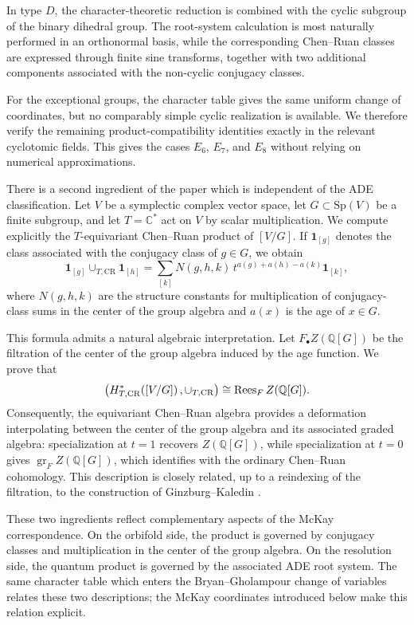 \documentclass[a4paper,reqno]{amsart}
\theoremstyle{plain} %
\theoremstyle{definition} %
\theoremstyle{remark} %
\newcommand{\fo}{\mathbf{1}}
\newcommand{\1}{\mathds{1}}   %
\begin{document}
In type \(D\), the character-theoretic reduction is combined with the cyclic subgroup of the binary dihedral group. 
The root-system calculation is most naturally performed in an orthonormal basis, 
while the corresponding Chen–Ruan classes are expressed through finite sine transforms, 
together with two additional components associated with the non-cyclic conjugacy classes.


For the exceptional groups, the character table gives the same uniform change
of coordinates, but no comparably simple cyclic realization is available. We
therefore verify the remaining product-compatibility identities exactly in the
relevant cyclotomic fields. This gives the cases $E_6$, $E_7$, and $E_8$
without relying on numerical approximations.

There is a second ingredient of the paper which is independent of the
ADE classification. Let $V$ be a symplectic complex vector space,
let $G\subset \mathrm{Sp}(V)$ be a finite subgroup, and let
$T=\mathbb C^*$ act on $V$ by scalar multiplication. We compute
explicitly the $T$-equivariant Chen--Ruan product of $[V/G]$. If
$\fo_{[g]}$ denotes the class associated with the conjugacy class of
$g\in G$, we obtain
\[
\fo_{[g]}\cup_{T,\mathrm{CR}}\fo_{[h]}
=
\sum_{[k]}
N(g,h,k)\,
t^{a(g)+a(h)-a(k)}\fo_{[k]},
\]
where $N(g,h,k)$ are the structure constants for multiplication of
conjugacy-class sums in the center of the group algebra and $a(x)$ is the age of $x \in G$.

This formula admits a natural algebraic interpretation. Let
$F_\bullet Z(\mathbb Q[G])$ be the filtration of the center of the
group algebra induced by the age function. We prove that
\[
\left( H^*_{T,\mathrm{CR}}([V/G]) \, , \cup_{T, {\rm CR}} \right) 
\cong
\operatorname{Rees}_{F}
Z(\mathbb Q[G]).
\]
Consequently, the equivariant Chen--Ruan algebra provides a
deformation interpolating between the center of the group algebra and
its associated graded algebra: specialization at $t=1$ recovers
$Z(\mathbb Q[G])$, while specialization at $t=0$ gives
$\operatorname{gr}_F Z(\mathbb Q[G])$, which identifies with the
ordinary Chen--Ruan cohomology. This description is closely related,
up to a reindexing of the filtration, to the construction of
Ginzburg--Kaledin \cite{GK}.

These two ingredients reflect complementary aspects of the McKay
correspondence. On the orbifold side, the product is governed by conjugacy
classes and multiplication in the center of the group algebra. On the
resolution side, the quantum product is governed by the associated ADE root
system. The same character table which enters the Bryan--Gholampour change of
variables relates these two descriptions; the McKay coordinates introduced
below make this relation explicit.
\end{document}
